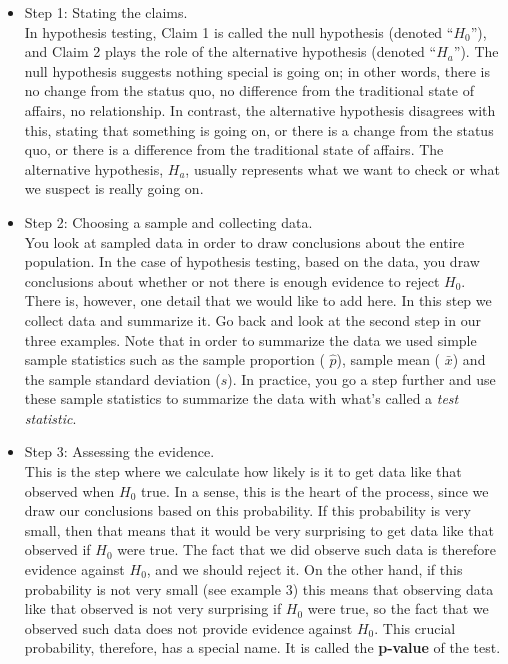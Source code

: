 \documentclass[10pt, a4paper]{article}
\begin{document}
\begin{itemize}
\item Step 1: Stating the claims.\\
In hypothesis testing, Claim 1 is called the null hypothesis (denoted ``$H_0$''), and Claim 2 plays the role of the alternative hypothesis (denoted ``$H_a$''). The null hypothesis suggests nothing special is going on; in other words, there is no change from the status quo, no difference from the traditional state of affairs, no relationship. In contrast, the alternative hypothesis disagrees with this, stating that something is going on, or there is a change from the status quo, or there is a difference from the traditional state of affairs. The alternative hypothesis, $H_a$, usually represents what we want to check or what we suspect is really going on.
\item Step 2: Choosing a sample and collecting data.\\
 You look at sampled data in order to draw conclusions about the entire population. In the case of hypothesis testing, based on the data, you draw conclusions about whether or not there is enough evidence to reject $H_0$.
There is, however, one detail that we would like to add here. In this step we collect data and summarize it. Go back and look at the second step in our three examples. Note that in order to summarize the data we used simple sample statistics such as the sample proportion (
$\hat{p}$), sample mean (
$\bar{x}$) and the sample standard deviation ($s$).
In practice, you go a step further and use these sample statistics to summarize the data with what's called a \emph{test statistic}.
\item Step 3: Assessing the evidence.\\
This is the step where we calculate how likely is it to get data like that observed when $H_0$ true. In a sense, this is the heart of the process, since we draw our conclusions based on this probability. If this probability is very small, then that means that it would be very surprising to get data like that observed if $H_0$ were true. The fact that we did observe such data is therefore evidence against $H_0$, and we should reject it. On the other hand, if this probability is not very small (see example 3) this means that observing data like that observed is not very surprising if $H_0$ were true, so the fact that we observed such data does not provide evidence against $H_0$. This crucial probability, therefore, has a special name. It is called the \textbf{p-value} of the test.\par

\end{itemize}
\end{document}
